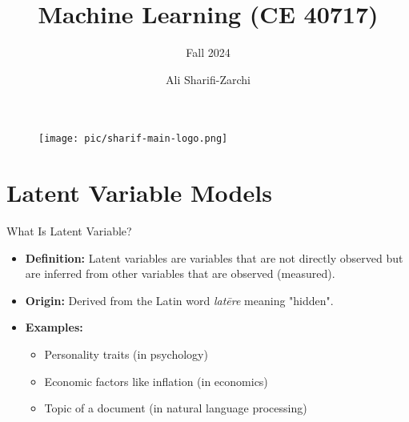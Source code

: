 \documentclass[serif, aspectratio=169]{beamer}
\author{Ali Sharifi-Zarchi}
\title{Machine Learning (CE 40717)}
\subtitle{Fall 2024}
\institute{
    CE Department \\
    Sharif University of Technology
}
\begin{document}
\begin{frame}
    \titlepage
    \vspace*{-0.6cm}
    \begin{figure}[htpb]
        \begin{center}
            \texttt{[image: pic/sharif-main-logo.png]}
        \end{center}
    \end{figure}
\end{frame}

\begin{frame}    
\tableofcontents[sectionstyle=show,
subsectionstyle=show/shaded/hide,
subsubsectionstyle=show/shaded/hide]
\end{frame}

\section{Latent Variable Models}


\begin{frame}{What Is Latent Variable?}
    \begin{itemize}
        \item \textbf{Definition:} Latent variables are variables that are not directly observed but are inferred from other variables that are observed (measured).
    \end{itemize}
    
    \vspace{0.5cm} %
    
    \begin{itemize}
        \item \textbf{Origin:} Derived from the Latin word \textit{latēre} meaning "hidden".
    \end{itemize}

    \vspace{0.5cm} %
    
    \begin{itemize}
        \item \textbf{Examples:}
        \begin{itemize}
            \item Personality traits (in psychology)
            \item Economic factors like inflation (in economics)
            \item Topic of a document (in natural language processing)
        \end{itemize}
    \end{itemize}

\end{frame}
\end{document}
